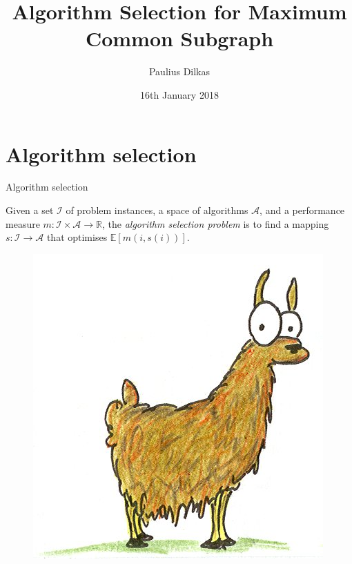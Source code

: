 \documentclass{beamer}
\author{Paulius Dilkas}
\title{Algorithm Selection for Maximum Common Subgraph}
\date{16th January 2018}
\institute{FATA seminar}
\begin{document}
\maketitle


\section{Algorithm selection}
\begin{frame}{Algorithm selection}
  \begin{definition}
    Given a set $\mathcal{I}$ of problem instances, a space of algorithms
    $\mathcal{A}$, and a performance measure $m \colon \mathcal{I} \times
    \mathcal{A} \to \mathbb{R}$, the \emph{algorithm selection problem} is to
    find a mapping $s \colon \mathcal{I} \to \mathcal{A}$ that optimises
    $\mathbb{E}[m(i, s(i))]$.
  \end{definition}
  \pause
  \begin{figure}
    \centering
    \includegraphics[scale=0.5]{llama.jpg}
  \end{figure}
\end{frame}
\end{document}

